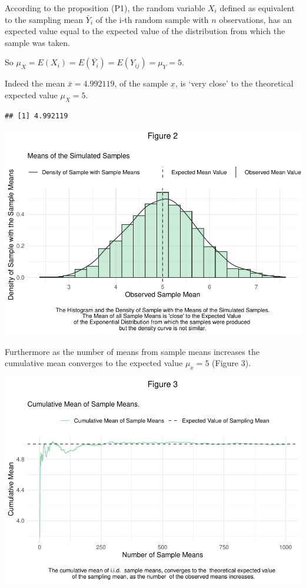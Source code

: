 \documentclass[
]{article}
\begin{document}
       According to the proposition (P1), the random variable \(X_i\)
       defined as equivalent to the sampling mean \(\bar{Y}_i\) of the
       i-th random sample with \(n\) observations, has an expected value
       equal to the expected value of the distribution from which the
       sample was taken.

       So \(\mu_{X} = E(X_i) = E(\bar{Y_i}) = E(Y_{ij}) = \mu_{Y} = 5\).

       Indeed the mean \(\bar{x} = 4.992119\), of the sample
       \(\underline{x}\), is `very close' to the theoretical expected
       value \(\mu_X = 5\).

\begin{verbatim}
## [1] 4.992119
\end{verbatim}

       \includegraphics{CLT_files/figure-latex/unnamed-chunk-8-1.pdf}

       Furthermore as the number of means from sample means increases
       the cumulative mean converges to the expected value \(\mu_x = 5\)
       (Figure 3).

       \includegraphics{CLT_files/figure-latex/unnamed-chunk-9-1.pdf}
\end{document}
